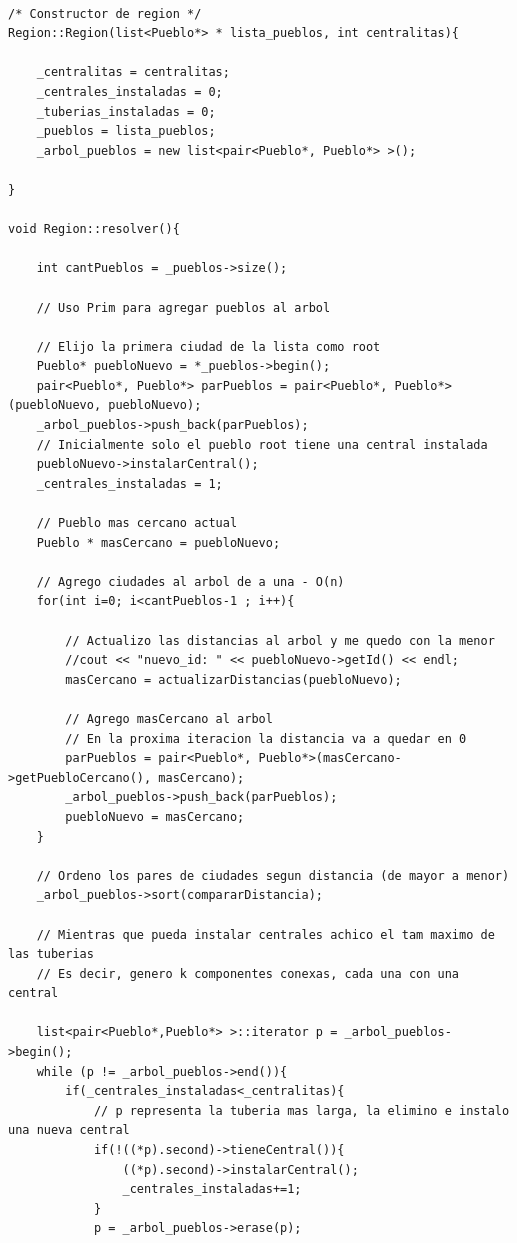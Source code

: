 \begin{lstlisting}

/* Constructor de region */
Region::Region(list<Pueblo*> * lista_pueblos, int centralitas){
	
	_centralitas = centralitas;
	_centrales_instaladas = 0;
	_tuberias_instaladas = 0;
	_pueblos = lista_pueblos;
	_arbol_pueblos = new list<pair<Pueblo*, Pueblo*> >();

}

void Region::resolver(){

	int cantPueblos = _pueblos->size();
	
	// Uso Prim para agregar pueblos al arbol

	// Elijo la primera ciudad de la lista como root
	Pueblo* puebloNuevo = *_pueblos->begin();
	pair<Pueblo*, Pueblo*> parPueblos = pair<Pueblo*, Pueblo*>(puebloNuevo, puebloNuevo);
	_arbol_pueblos->push_back(parPueblos);
	// Inicialmente solo el pueblo root tiene una central instalada
	puebloNuevo->instalarCentral();
	_centrales_instaladas = 1;

	// Pueblo mas cercano actual
	Pueblo * masCercano = puebloNuevo;

	// Agrego ciudades al arbol de a una - O(n)
	for(int i=0; i<cantPueblos-1 ; i++){
		
		// Actualizo las distancias al arbol y me quedo con la menor
		//cout << "nuevo_id: " << puebloNuevo->getId() << endl;
		masCercano = actualizarDistancias(puebloNuevo);

		// Agrego masCercano al arbol
		// En la proxima iteracion la distancia va a quedar en 0
		parPueblos = pair<Pueblo*, Pueblo*>(masCercano->getPuebloCercano(), masCercano);
		_arbol_pueblos->push_back(parPueblos);
		puebloNuevo = masCercano;
	}

	// Ordeno los pares de ciudades segun distancia (de mayor a menor)
	_arbol_pueblos->sort(compararDistancia);

	// Mientras que pueda instalar centrales achico el tam maximo de las tuberias
	// Es decir, genero k componentes conexas, cada una con una central

	list<pair<Pueblo*,Pueblo*> >::iterator p = _arbol_pueblos->begin();
	while (p != _arbol_pueblos->end()){
		if(_centrales_instaladas<_centralitas){
			// p representa la tuberia mas larga, la elimino e instalo una nueva central
			if(!((*p).second)->tieneCentral()){
				((*p).second)->instalarCentral();
				_centrales_instaladas+=1;
			}
			p = _arbol_pueblos->erase(p);
			

\end{lstlisting}
